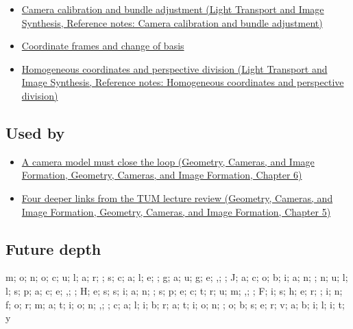 \begin{itemize}
\tightlist
\item
  \href{../04-Light-Transport-and-Image-Synthesis/main.pdf\#nameddest=appendix-3ee9861904d5}{Camera calibration and bundle adjustment (Light Transport and Image Synthesis, Reference notes: Camera calibration and bundle adjustment)}
\item
  \hyperref[appendix-1bae9457dbc3]{Coordinate frames and change of basis}
\item
  \href{../04-Light-Transport-and-Image-Synthesis/main.pdf\#nameddest=appendix-cb3b26862282}{Homogeneous coordinates and perspective division (Light Transport and Image Synthesis, Reference notes: Homogeneous coordinates and perspective division)}
\end{itemize}

\subsection{Used by}\label{appendix-113f0267e5f4-used-by}

\begin{itemize}
\tightlist
\item
  \href{../03-Geometry-Cameras-and-Image-Formation/main.pdf\#nameddest=02-foundations-ii-ch037-a-camera-model-must-close-the-loop}{A camera model must close the loop (Geometry, Cameras, and Image Formation, Geometry, Cameras, and Image Formation, Chapter 6)}
\item
  \href{../03-Geometry-Cameras-and-Image-Formation/main.pdf\#nameddest=02-foundations-ii-ch036-four-deeper-links-from-the-tum-lecture-review}{Four deeper links from the TUM lecture review (Geometry, Cameras, and Image Formation, Geometry, Cameras, and Image Formation, Chapter 5)}
\end{itemize}

\subsection{Future depth}\label{appendix-113f0267e5f4-future-depth}

m; o; n; o; c; u; l; a; r; ; s; c; a; l; e; ; g; a; u; g; e; ,; ; J; a; c; o; b; i; a; n; ; n; u; l; l; s; p; a; c; e; ,; ; H; e; s; s; i; a; n; ; s; p; e; c; t; r; u; m; ,; ; F; i; s; h; e; r; ; i; n; f; o; r; m; a; t; i; o; n; ,; ; c; a; l; i; b; r; a; t; i; o; n; ; o; b; s; e; r; v; a; b; i; l; i; t; y
